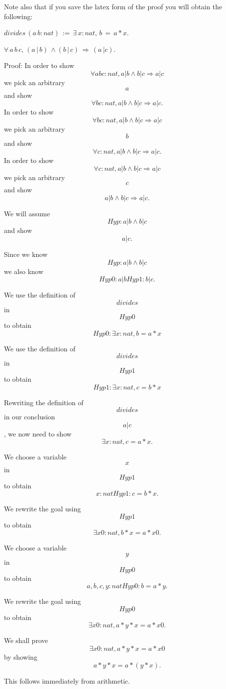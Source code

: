 Note also that if you save the latex form of the proof you will obtain the following:
\begin{tcolorbox}[colback=gray!10!white,colframe=white,breakable]
\begin{Definition}[divides] 
$divides\,(a\,b:nat)\,:=\,∃\,x:nat,\,b\,=\,a*x.
$
 \end{Definition}
\begin{Theorem}[refldiv] 
$\forall \,a\,b\,c,\,(a\,|\,b)\,\land (b\,|\,c)\,\Rightarrow \,(a\,|c).$
 \end{Theorem}
 Proof: In order to show $$\forall a b c : nat, a | b \land b | c \Rightarrow a | c $$ we pick an arbitrary $$a$$ and show $$\forall b c : nat, a | b \land b | c \Rightarrow a | c .$$
 In order to show $$\forall b c : nat, a | b \land b | c \Rightarrow a | c $$ we pick an arbitrary $$b$$ and show $$\forall c : nat, a | b \land b | c \Rightarrow a | c .$$
 In order to show $$\forall c : nat, a | b \land b | c \Rightarrow a | c $$ we pick an arbitrary $$c$$ and show $$a | b \land b | c \Rightarrow a | c .$$

 

 We will assume $$Hyp : a | b \land b | c $$ and show $$a | c .$$

 Since we know $$Hyp : a | b \land b | c $$ we also know $$Hyp0 : a | b 
Hyp1 : b | c .$$

 We use the definition of $$divides$$ in $$Hyp0$$ to obtain $$Hyp0 : \exists x : nat, b = a * x $$ 

 We use the definition of $$divides$$ in $$Hyp1$$ to obtain $$Hyp1 : \exists x : nat, c = b * x $$ 

 Rewriting the definition of $$divides$$ in our conclusion $$a | c $$, we now need to show $$\exists x : nat, c = a * x .$$

 We choose a variable $$x$$ in $$Hyp1$$ to obtain $$x : nat 
Hyp1 : c = b * x .$$

 We rewrite the goal using $$Hyp1$$ to obtain $$\exists x0 : nat, b * x = a * x0 .$$

 We choose a variable $$y$$ in $$Hyp0$$ to obtain $$a, b, c, y : nat 
Hyp0 : b = a * y .$$

 We rewrite the goal using $$Hyp0$$ to obtain $$\exists x0 : nat, a * y * x = a * x0 .$$

 We shall prove $$\exists x0 : nat, a * y * x = a * x0 $$ by showing $$a * y * x = a * (y * x) .$$

 This follows immediately from arithmetic.


\end{tcolorbox}
